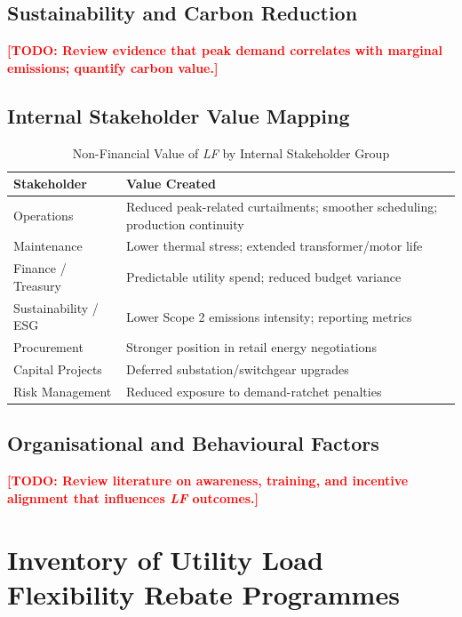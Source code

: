 \documentclass[12pt, a4paper, twocolumn]{article}
\newcommand{\LF}{\textit{LF}}
\newcommand{\TODO}[1]{\textcolor{red}{\textbf{[TODO: #1]}}}
\begin{document}
\subsection{Sustainability and Carbon Reduction}
\TODO{Review evidence that peak demand correlates with marginal emissions; quantify carbon value.}

\subsection{Internal Stakeholder Value Mapping}
\begin{table}[H]
\centering
\caption{Non-Financial Value of \LF{} by Internal Stakeholder Group}
\label{tab:stakeholder}
\begin{tabularx}{\columnwidth}{lX}
\toprule
\textbf{Stakeholder} & \textbf{Value Created} \\
\midrule
Operations     & Reduced peak-related curtailments; smoother scheduling; production continuity \\
Maintenance    & Lower thermal stress; extended transformer/motor life \\
Finance / Treasury & Predictable utility spend; reduced budget variance \\
Sustainability / ESG & Lower Scope 2 emissions intensity; reporting metrics \\
Procurement    & Stronger position in retail energy negotiations \\
Capital Projects & Deferred substation/switchgear upgrades \\
Risk Management & Reduced exposure to demand-ratchet penalties \\
\bottomrule
\end{tabularx}
\end{table}

\subsection{Organisational and Behavioural Factors}
\TODO{Review literature on awareness, training, and incentive alignment that influences \LF{} outcomes.}


\section{Inventory of Utility Load Flexibility Rebate Programmes}
\label{sec:rebate-inventory}
\end{document}
